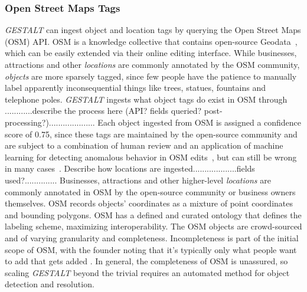 \subsubsection{Open Street Maps Tags}
\emph{GESTALT} can ingest object and location tags by querying the Open Street Maps (OSM) API.
OSM is a knowledge collective that contains open-source Geodata~\cite{Haklay2008}, which can be easily extended via their online editing interface.
While businesses, attractions and other \textit{locations} are commonly annotated by the OSM community, \textit{objects} are more sparsely tagged, since few people have the patience to manually label apparently inconsequential things like trees, statues, fountains and telephone poles. 
\emph{GESTALT} ingests what object tags do exist in OSM through 
............describe the process here (API? fields queried? post-processing?)....................
Each object ingested from OSM is assigned a confidence score of 0.75, since these tags are maintained by the open-source community and are subject to a combination of human review and an application of machine learning for detecting anomalous behavior in OSM edits~\cite{Mooney2017}, but can still be wrong in many cases~\cite{VargasMunoz2020}.
Describe how locations are ingested...................fields used?..............%
Businesses, attractions and other higher-level \textit{locations} are commonly annotated in OSM by the open-source community or business owners themselves.
OSM records objects' coordinates as a mixture of point coordinates and bounding polygons. 
OSM has a defined and curated ontology that defines the labeling scheme, maximizing interoperability. 
The OSM objects are crowd-sourced and of varying granularity and completeness. Incompleteness is part of the initial scope of OSM, with the founder noting that it's typically only what people want to add that gets added \cite{Haklay2008}.
In general, the completeness of OSM is unassured, so scaling \textit{GESTALT} beyond the trivial requires an automated method for object detection and resolution. 


